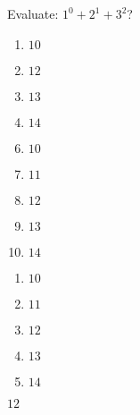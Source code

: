 

  Evaluate: $1^{0}+2^{1}+3^{2}$?


\ifsat
	\begin{enumerate}[label=\Alph*)]
		\item    $10$
		\item $12$ %
		\item $13$ 
		\item  $14$ 
	\end{enumerate}
\else
\fi

\ifacteven
	\begin{enumerate}[label=\textbf{\Alph*.},itemsep=\fill,align=left]
		\setcounter{enumii}{5}
		\item    $10$
		\item  $11$ 
		\item $12$ %
		\addtocounter{enumii}{1}
		\item $13$ 
		\item  $14$ 
	\end{enumerate}
\else
\fi

\ifactodd
	\begin{enumerate}[label=\textbf{\Alph*.},itemsep=\fill,align=left]
		\item    $10$
		\item  $11$ 
		\item $12$ %
		\item $13$ 
		\item  $14$ 
	\end{enumerate}
\else
\fi

\ifgridin
 $12$ %
		
\else
\fi

